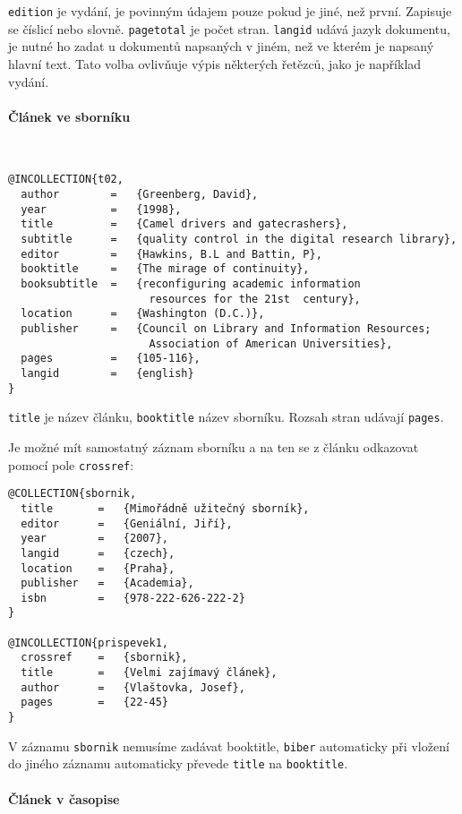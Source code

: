 \documentclass[a4paper,10pt]{ltxdockit}
\def\t|#1|{\texttt{#1}}
\def\c#1{%
\hangpara{3em}{1}%
\fullcite{#1}}
\begin{document}
\t|edition| je vydání, je povinným údajem pouze pokud je jiné, než první. Zapisuje se číslicí nebo slovně. \t|pagetotal| je počet stran. \t|langid| udává jazyk dokumentu, je nutné ho zadat u dokumentů napsaných v jiném, než ve kterém je napsaný hlavní text. Tato volba ovlivňuje výpis některých řetězců, jako je například vydání.

\paragraph{Článek ve sborníku} \hfill\\

\c{t02}
\begin{verbatim}
@INCOLLECTION{t02,
  author        =   {Greenberg, David}, 
  year          =   {1998},
  title         =   {Camel drivers and gatecrashers},
  subtitle      =   {quality control in the digital research library},
  editor        =   {Hawkins, B.L and Battin, P},
  booktitle     =   {The mirage of continuity},
  booksubtitle  =   {reconfiguring academic information 
                      resources for the 21st  century}, 
  location      =   {Washington (D.C.)}, 
  publisher     =   {Council on Library and Information Resources; 
                      Association of American Universities}, 
  pages         =   {105-116},
  langid        =   {english}
}
\end{verbatim} 
 \t|title| je název článku, \t|booktitle| název sborníku. Rozsah stran udávají \t|pages|.
 
 Je možné mít samostatný záznam sborníku a na ten se z článku odkazovat pomocí pole \t|crossref|:
 
\noindent\c{prispevek1}
 
 \begin{verbatim}
@COLLECTION{sbornik,
  title       =   {Mimořádně užitečný sborník},
  editor      =   {Geniální, Jiří},
  year        =   {2007},
  langid      =   {czech},
  location    =   {Praha},
  publisher   =   {Academia},
  isbn        =   {978-222-626-222-2}
}

@INCOLLECTION{prispevek1,
  crossref    =   {sbornik},
  title       =   {Velmi zajímavý článek},
  author      =   {Vlaštovka, Josef},
  pages       =   {22-45}
}
 \end{verbatim}
 
 V záznamu \t|sbornik| nemusíme zadávat booktitle, \t|biber| automaticky při vložení do jiného záznamu automaticky převede \t|title| na \t|booktitle|. 
 
 \paragraph{Článek v časopise}\hfill\\
 
\end{document}
